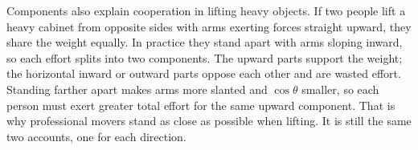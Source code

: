 \begin{mainline}
Components also explain cooperation in lifting heavy objects. If two people lift a heavy cabinet from opposite sides with arms exerting forces straight upward, they share the weight equally. In practice they stand apart with arms sloping inward, so each effort splits into two components. The upward parts support the weight; the horizontal inward or outward parts oppose each other and are wasted effort. Standing farther apart makes arms more slanted and \(\cos\theta\) smaller, so each person must exert greater total effort for the same upward component. That is why professional movers stand as close as possible when lifting. It is still the same two accounts, one for each direction.
\end{mainline}

\begin{center}
\end{center}

